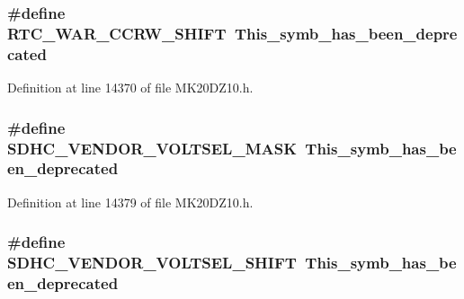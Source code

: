 \subsubsection[{\texorpdfstring{R\+T\+C\+\_\+\+W\+A\+R\+\_\+\+C\+C\+R\+W\+\_\+\+S\+H\+I\+FT}{RTC_WAR_CCRW_SHIFT}}]{\setlength{\rightskip}{0pt plus 5cm}\#define R\+T\+C\+\_\+\+W\+A\+R\+\_\+\+C\+C\+R\+W\+\_\+\+S\+H\+I\+FT~This\+\_\+symb\+\_\+has\+\_\+been\+\_\+deprecated}\hypertarget{group___backward___compatibility___symbols_ga4850a9788a57e8f73c3d588728864308}{}\label{group___backward___compatibility___symbols_ga4850a9788a57e8f73c3d588728864308}


Definition at line 14370 of file M\+K20\+D\+Z10.\+h.

\subsubsection[{\texorpdfstring{S\+D\+H\+C\+\_\+\+V\+E\+N\+D\+O\+R\+\_\+\+V\+O\+L\+T\+S\+E\+L\+\_\+\+M\+A\+SK}{SDHC_VENDOR_VOLTSEL_MASK}}]{\setlength{\rightskip}{0pt plus 5cm}\#define S\+D\+H\+C\+\_\+\+V\+E\+N\+D\+O\+R\+\_\+\+V\+O\+L\+T\+S\+E\+L\+\_\+\+M\+A\+SK~This\+\_\+symb\+\_\+has\+\_\+been\+\_\+deprecated}\hypertarget{group___backward___compatibility___symbols_gaecd3639f4a53ededc6f279d8830f11ff}{}\label{group___backward___compatibility___symbols_gaecd3639f4a53ededc6f279d8830f11ff}


Definition at line 14379 of file M\+K20\+D\+Z10.\+h.

\subsubsection[{\texorpdfstring{S\+D\+H\+C\+\_\+\+V\+E\+N\+D\+O\+R\+\_\+\+V\+O\+L\+T\+S\+E\+L\+\_\+\+S\+H\+I\+FT}{SDHC_VENDOR_VOLTSEL_SHIFT}}]{\setlength{\rightskip}{0pt plus 5cm}\#define S\+D\+H\+C\+\_\+\+V\+E\+N\+D\+O\+R\+\_\+\+V\+O\+L\+T\+S\+E\+L\+\_\+\+S\+H\+I\+FT~This\+\_\+symb\+\_\+has\+\_\+been\+\_\+deprecated}\hypertarget{group___backward___compatibility___symbols_gabf43e67f74b7577c19572c627c7b9155}{}\label{group___backward___compatibility___symbols_gabf43e67f74b7577c19572c627c7b9155}


